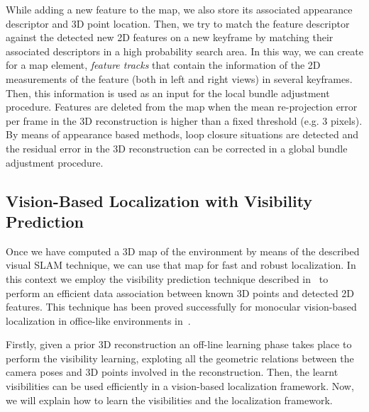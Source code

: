 While adding a new feature to the map, we also store its associated appearance descriptor and 3D point location. Then, we try to match the feature descriptor against the detected new 2D features
on a new keyframe by matching their associated descriptors in a high probability search area. In this way, we can create for a map element, \textit{feature tracks} that contain the information of the 2D
measurements of the feature (both in left and right views) in several keyframes. Then, this information is used as an input for the local bundle adjustment procedure. Features are deleted from the map when
the mean re-projection error per frame in the 3D reconstruction is higher than a fixed threshold (e.g. 3 pixels). By means of appearance based methods, loop closure situations are detected and the residual error in the 3D reconstruction can be corrected in a global bundle adjustment procedure.

\subsection{Vision-Based Localization with Visibility Prediction}\label{sec:vision_localization}
Once we have computed a 3D map of the environment by means of the described visual SLAM technique, we can use that map for fast and robust localization. In this context we employ the visibility prediction technique described in~\cite{Alcantarilla11icra} to perform an efficient data association between known 3D points and detected 2D features. This technique has been proved successfully for monocular vision-based localization in office-like environments in~\cite{Alcantarilla10icra}.

Firstly, given a prior 3D reconstruction an off-line learning phase takes place to perform the visibility learning, exploting all the geometric relations between the camera poses and 3D points involved in the reconstruction. Then, the learnt visibilities can be used efficiently in a vision-based localization framework. Now, we will explain how to learn the visibilities and the localization framework.

